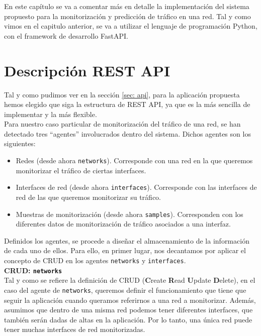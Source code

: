 \documentclass[a4paper, oneside, 12pt]{book}
\begin{document}
	\noindent En este capítulo se va a comentar más en detalle la implementación del sistema propuesto para la monitorización y predicción de tráfico en una red. Tal y como vimos en el capitulo anterior, se va a utilizar el lenguaje de programación Python, con el framework de desarrollo FastAPI.
	
	\section{Descripción REST API}
	
	\noindent Tal y como pudimos ver en la sección \ref{sec: api}, para la aplicación propuesta hemos elegido que siga la estructura de REST API, ya que es la más sencilla de implementar y la más flexible. \\
	
	\noindent Para nuestro caso particular de monitorización del tráfico de una red, se han detectado tres ``agentes'' involucrados dentro del sistema. Dichos agentes son los siguientes:
	
	\begin{itemize}
		\item Redes (desde ahora \texttt{networks}). Corresponde con una red en la que queremos monitorizar el tráfico de ciertas interfaces.
		\item Interfaces de red (desde ahora \texttt{interfaces}). Corresponde con las interfaces de red de las que queremos monitorizar su tráfico.
		\item Muestras de monitorización (desde ahora \texttt{samples}). Corresponden con los diferentes datos de monitorización de tráfico asociados a una interfaz.
	\end{itemize}

	\noindent Definidos los agentes, se procede a diseñar el almacenamiento de la información de cada uno de ellos. Para ello, en primer lugar, nos decantamos por aplicar el concepto de CRUD en los agentes \texttt{networks} y \texttt{interfaces}. \\
	
	\noindent \textbf{\large CRUD: \texttt{networks}} \\
	
	\noindent Tal y como se refiere la definición de CRUD (\textbf{C}reate \textbf{R}ead \textbf{U}pdate \textbf{D}elete), en el caso del agente de \texttt{networks}, queremos definir el funcionamiento que tiene que seguir la aplicación cuando queramos referirnos a una red a monitorizar. Además, asumimos que dentro de una misma red podemos tener diferentes interfaces, que también serán dadas de altas en la aplicación. Por lo tanto, una única red puede tener muchas interfaces de red monitorizadas. \\
	
\end{document}
